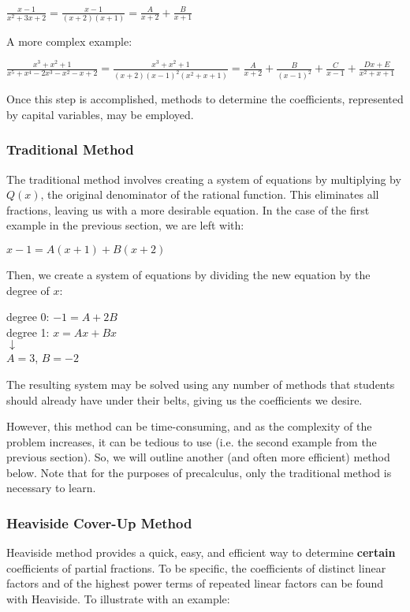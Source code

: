\documentclass[11pt]{article}
\begin{document}
\begin{center}
$\frac{x-1}{x^2+3x+2} = \frac{x-1}{(x+2)(x+1)} = \frac{A}{x+2} + \frac{B}{x+1}$
\end{center}

A more complex example:

\begin{center}
$\frac{x^3+x^2+1}{x^5+x^4-2x^3-x^2-x+2} = \frac{x^3+x^2+1}{(x+2)(x-1)^2(x^2+x+1)} = \frac{A}{x+2} + \frac{B}{(x-1)^2} + \frac{C}{x-1} + \frac{Dx+E}{x^2+x+1}$
\end{center}

Once this step is accomplished, methods to determine the coefficients, represented by capital variables, may be employed.

\subsubsection{Traditional Method}
The traditional method involves creating a system of equations by multiplying by $Q(x)$, the original denominator of the rational function. This eliminates all fractions, leaving us with a more desirable equation. In the case of the first example in the previous section, we are left with:

\begin{center}
$x-1 = A(x+1) + B(x+2)$
\end{center}

Then, we create a system of equations by dividing the new equation by the degree of $x$:

\begin{center}
degree 0: $-1 = A + 2B$ \\
degree 1: $x = Ax + Bx$ \\
$\downarrow$ \\
$A = 3$, $B = -2$
\end{center}

The resulting system may be solved using any number of methods that students should already have under their belts, giving us the coefficients we desire. 

However, this method can be time-consuming, and as the complexity of the problem increases, it can be tedious to use (i.e. the second example from the previous section). So, we will outline another (and often more efficient) method below. Note that for the purposes of precalculus, only the traditional method is necessary to learn.

\subsubsection{Heaviside Cover-Up Method}
Heaviside method provides a quick, easy, and efficient way to determine \textbf{certain} coefficients of partial fractions. To be specific, the coefficients of distinct linear factors and of the highest power terms of repeated linear factors can be found with Heaviside. To illustrate with an example:
\end{document}
